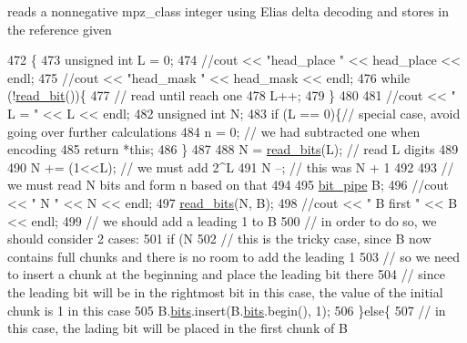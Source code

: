 reads a nonnegative mpz\+\_\+class integer using Elias delta decoding and stores in the reference given 


\begin{DoxyCode}
472                                                 \{
473   \textcolor{keywordtype}{unsigned} \textcolor{keywordtype}{int} L = 0;
474   \textcolor{comment}{//cout << "head\_place " << head\_place << endl;}
475   \textcolor{comment}{//cout << "head\_mask  " << head\_mask << endl;}
476   \textcolor{keywordflow}{while} (!\hyperlink{classibitstream_a895239acf7179f6778388c39c97643e4}{read\_bit}())\{
477     \textcolor{comment}{// read until reach one}
478     L++;
479   \}
480 
481   \textcolor{comment}{//cout << " L = " << L << endl;}
482   \textcolor{keywordtype}{unsigned} \textcolor{keywordtype}{int} N;
483   \textcolor{keywordflow}{if} (L == 0)\{\textcolor{comment}{// special case, avoid going over further calculations}
484     n = 0; \textcolor{comment}{// we had subtracted one when encoding }
485     \textcolor{keywordflow}{return} *\textcolor{keyword}{this};
486   \}
487 
488   N = \hyperlink{classibitstream_a2fdcaecf10fefa6942dcd5286a2696e0}{read\_bits}(L); \textcolor{comment}{// read L digits}
489   
490   N += (1<<L); \textcolor{comment}{// we must add 2^L}
491   N --; \textcolor{comment}{// this was N + 1}
492 
493   \textcolor{comment}{// we must read N bits and form n based on that}
494 
495   \hyperlink{classbit__pipe}{bit\_pipe} B;
496   \textcolor{comment}{//cout << " N " << N << endl;}
497   \hyperlink{classibitstream_a2fdcaecf10fefa6942dcd5286a2696e0}{read\_bits}(N, B);
498   \textcolor{comment}{//cout << " B first " << B << endl;}
499   \textcolor{comment}{// we should add a leading 1 to B}
500   \textcolor{comment}{// in order to do so, we should consider 2 cases:}
501   \textcolor{keywordflow}{if} (N %
502     \textcolor{comment}{// this is the tricky case, since B now contains full chunks and there is no room to add the leading 1}
503     \textcolor{comment}{// so we need to insert a chunk at the beginning and place the leading bit there}
504     \textcolor{comment}{// since the leading bit will be in the rightmost bit in this case, the value of the initial chunk is 1
       in this case}
505     B.\hyperlink{classbit__pipe_a86f38af1e9736b053728033490476b50}{bits}.insert(B.\hyperlink{classbit__pipe_a86f38af1e9736b053728033490476b50}{bits}.begin(), 1);
506   \}\textcolor{keywordflow}{else}\{
507     \textcolor{comment}{// in this case, the lading bit will be placed in the first chunk of B}

\end{DoxyCode}
